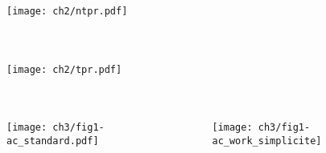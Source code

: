 
\begin{frame}{}

    \begin{columns}
        \begin{figure}[H]
            \centering
            \texttt{[image: ch2/ntpr.pdf]}

        \end{figure}
 
    \end{columns}


\end{frame}

\begin{frame}{}

    \begin{columns}
        \begin{figure}[H]
            \centering
            \texttt{[image: ch2/tpr.pdf]}

        \end{figure}

    \end{columns}


\end{frame}




\begin{frame}{}
    \begin{columns}
        \begin{figure}[H]
            \centering
            \texttt{[image: ch3/fig1-ac\_standard.pdf]}
        \end{figure}

        \begin{figure}[H]
            \centering
            \texttt{[image: ch3/fig1-ac\_work\_simplicite]}
        \end{figure}
    \end{columns}
\end{frame}


